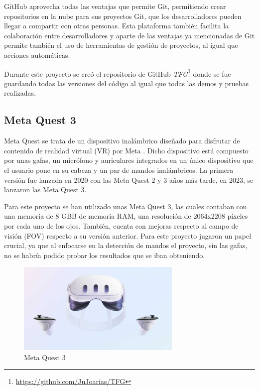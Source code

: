 \documentclass[a4paper, 12pt]{book}
\begin{document}
GitHub aprovecha todas las ventajas que permite Git, permitiendo crear repositorios en la nube para sus proyectos Git, que los desarrolladores pueden llegar a compartir con otras personas. Esta plataforma también facilita la colaboración entre desarrolladores y aparte de las ventajas ya mencionadas de Git permite también el uso de herramientas de gestión de proyectos, al igual que acciones automáticas. 

Durante este proyecto se creó el repositorio de GitHub \textit{TFG}\footnote{\url{https://github.com/JuJoarias/TFG}} donde se fue guardando todas las versiones del código al igual que todas las demos y pruebas realizadas.

\subsection{Meta Quest 3}
\label{subsec:metaquest}

Meta Quest se trata de un dispositivo inalámbrico diseñado para disfrutar de contenido de realidad virtual (VR) por Meta \cite{meta_company_info}. Dicho dispositivo está compuesto por unas gafas, un micrófono y auriculares integrados en un único dispositivo que el usuario pone en su cabeza y un par de mandos inalámbricos. 
La primera versión fue lanzada en 2020 con las Meta Quest 2 y 3 años más tarde, en 2023, se lanzaron las Meta Quest 3. 

Para este proyecto se han utilizado unas Meta Quest 3, las cuales contaban con una memoria de 8 GBB de memoria RAM, una resolución de 2064x2208 píxeles por cada uno de los ojos. También, cuenta con mejoras respecto al campo de visión (FOV) respecto a su versión anterior. Para este proyecto jugaron un papel crucial, ya que al enfocarse en la detección de mandos
el proyecto, sin las gafas, no se habría podido probar los resultados que se iban obteniendo.

\begin{figure}[H] 
  \centering
  \includegraphics[width=0.7\textwidth]{img/meta_quest.jpg}
  \caption{Meta Quest 3}
  \label{fig:metaquest}
\end{figure}
\end{document}
